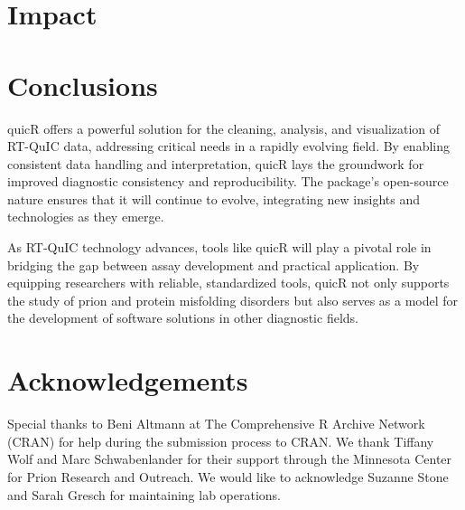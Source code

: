 \documentclass[preprint,12pt, a4paper]{elsarticle}
\begin{document}
\section{Impact}

\section{Conclusions}
    quicR offers a powerful solution for the cleaning, analysis, and visualization of RT-QuIC data, addressing critical needs in a rapidly evolving field. By enabling consistent data handling and interpretation, quicR lays the groundwork for improved diagnostic consistency and reproducibility. The package's open-source nature ensures that it will continue to evolve, integrating new insights and technologies as they emerge.

    As RT-QuIC technology advances, tools like quicR will play a pivotal role in bridging the gap between assay development and practical application. By equipping researchers with reliable, standardized tools, quicR not only supports the study of prion and protein misfolding disorders but also serves as a model for the development of software solutions in other diagnostic fields.

\section*{Acknowledgements}
\label{}
Special thanks to Beni Altmann at The Comprehensive R Archive Network (CRAN) for help during the submission process to CRAN. We thank Tiffany Wolf and Marc Schwabenlander for their support through the Minnesota Center for Prion Research and Outreach. We would like to acknowledge Suzanne Stone and Sarah Gresch for maintaining lab operations.
\end{document}
